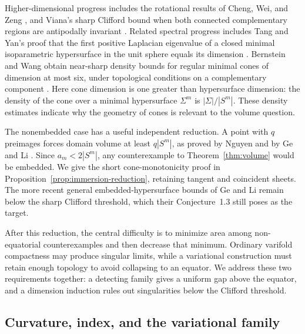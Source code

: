 Higher-dimensional progress includes the rotational results of Cheng,
Wei, and Zeng \cite[Theorem~1.1]{ChengWeiZeng2019}, and Viana's sharp
Clifford bound when both connected complementary regions are
antipodally invariant \cite[Theorem~1.4]{Viana2023}.
Related spectral progress includes Tang and Yan's proof that the first
positive Laplacian eigenvalue of a closed minimal isoparametric
hypersurface in the unit sphere equals its dimension
\cite[Theorem~1.1]{TangYan2013}.
Bernstein and Wang obtain near-sharp density bounds for regular minimal
cones of dimension at most six, under topological conditions on a
complementary component \cite[Theorems~1.1--1.2]{BernsteinWang2025}.
Here cone dimension is one greater than hypersurface dimension: the
density of the cone over a minimal hypersurface \(\Sigma^m\) is
\(|\Sigma|/|S^m|\). These density estimates indicate why the geometry of
cones is relevant to the volume question.

The nonembedded case has a useful independent reduction. A point with
\(q\) preimages forces domain volume at least \(q|S^m|\), as proved by
Nguyen \cite[Corollary~4.8 and Remark~4.9]{Nguyen2023} and by
Ge and Li \cite[Theorem~1.2 and Corollary~1.3]{GeLi2022}.
Since \(a_m<2|S^m|\), any counterexample to Theorem~\ref{thm:volume}
would be embedded. We give the short cone-monotonicity proof in
Proposition~\ref{prop:immersion-reduction}, retaining tangent and
coincident sheets. The more recent general embedded-hypersurface bounds of Ge and Li
\cite[Theorems~1.4 and 1.6]{GeLi2026II} remain below the sharp Clifford
threshold, which their Conjecture~1.3 still poses as the target.

After this reduction, the central difficulty is to minimize area among
non-equatorial counterexamples and then decrease that minimum.
Ordinary varifold compactness may produce singular limits, while a
variational construction must retain enough topology to avoid collapsing
to an equator. We address these two requirements together: a detecting
family gives a uniform gap above the equator, and a dimension induction
rules out singularities below the Clifford threshold.

\subsection*{Curvature, index, and the variational family}

